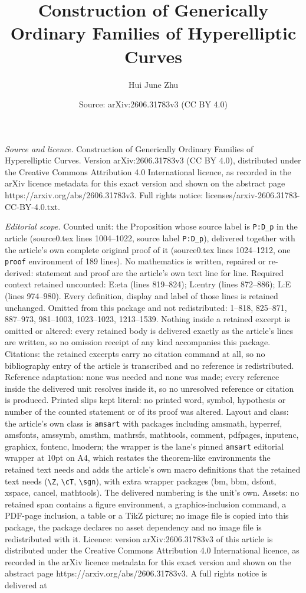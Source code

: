 \documentclass[10pt,a4paper]{amsart}
\title[Construction of Generically Ordinary Families of Hyperellipt]{Construction of Generically Ordinary Families of Hyperelliptic Curves}
\author{Hui June Zhu}
\date{Source: arXiv:2606.31783v3 (CC BY 4.0)}
\begin{document}
\maketitle

\noindent\emph{Source and licence.} Construction of Generically Ordinary Families of Hyperelliptic Curves. Version arXiv:2606.31783v3 (CC BY 4.0), distributed under the Creative Commons Attribution 4.0 International licence, as recorded in the arXiv licence metadata for this exact version and shown on the abstract page https://arxiv.org/abs/2606.31783v3. Full rights notice: licenses/arxiv-2606.31783-CC-BY-4.0.txt.\par\smallskip

\noindent\textit{Editorial scope.} Counted unit: the Proposition whose source label is \texttt{P:D\_p} in the article (source0.tex lines 1004--1022, source label \texttt{P:D\_p}), delivered together with the article's own complete original proof of it (source0.tex lines 1024--1212, one \texttt{proof} environment of 189 lines). No mathematics is written, repaired or re-derived: statement and proof are the article's own text line for line. Required context retained uncounted: E:eta (lines 819--824); L:entry (lines 872--886); L:E (lines 974--980). Every definition, display and label of those lines is retained unchanged. Omitted from this package and not redistributed: 1--818, 825--871, 887--973, 981--1003, 1023--1023, 1213--1539. Nothing inside a retained excerpt is omitted or altered: every retained body is delivered exactly as the article's lines are written, so no omission receipt of any kind accompanies this package. Citations: the retained excerpts carry no citation command at all, so no bibliography entry of the article is transcribed and no reference is redistributed. Reference adaptation: none was needed and none was made; every reference inside the delivered unit resolves inside it, so no unresolved reference or citation is produced. Printed slips kept literal: no printed word, symbol, hypothesis or number of the counted statement or of its proof was altered. Layout and class: the article's own class is \texttt{amsart} with packages including amsmath, hyperref, amsfonts, amssymb, amsthm, mathrsfs, mathtools, comment, pdfpages, inputenc, graphicx, fontenc, lmodern; the wrapper is the lane's pinned \texttt{amsart} editorial wrapper at 10pt on A4, which restates the theorem-like environments the retained text needs and adds the article's own macro definitions that the retained text needs (\texttt{\textbackslash Z}, \texttt{\textbackslash cT}, \texttt{\textbackslash sgn}), with extra wrapper packages (bm, bbm, dsfont, xspace, cancel, mathtools). The delivered numbering is the unit's own. Assets: no retained span contains a figure environment, a graphics-inclusion command, a PDF-page inclusion, a table or a TikZ picture; no image file is copied into this package, the package declares no asset dependency and no image file is redistributed with it. Licence: version arXiv:2606.31783v3 of this article is distributed under the Creative Commons Attribution 4.0 International licence, as recorded in the arXiv licence metadata for this exact version and shown on the abstract page https://arxiv.org/abs/2606.31783v3. A full rights notice is delivered at 
\end{document}
